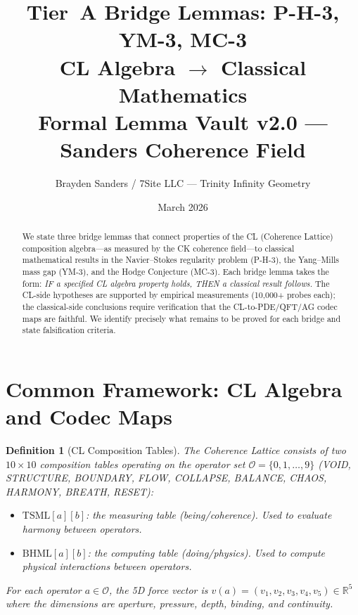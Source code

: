 \documentclass[11pt]{article}
\title{%
  Tier~A Bridge Lemmas: P-H-3, YM-3, MC-3\\[4pt]
  \large CL Algebra $\longrightarrow$ Classical Mathematics\\[4pt]
  \large Formal Lemma Vault v2.0 --- Sanders Coherence Field}
\author{Brayden Sanders / 7Site LLC --- Trinity Infinity Geometry}
\date{March 2026}
\newtheorem{definition}[lemma]{Definition}
\theoremstyle{definition}
\begin{document}
\maketitle

\begin{abstract}
We state three bridge lemmas that connect properties of the CL (Coherence Lattice)
composition algebra---as measured by the CK coherence field---to classical mathematical
results in the Navier--Stokes regularity problem (P-H-3), the Yang--Mills mass gap (YM-3),
and the Hodge Conjecture (MC-3).  Each bridge lemma takes the form:
\emph{IF a specified CL algebra property holds, THEN a classical result follows.}
The CL-side hypotheses are supported by empirical measurements (10,000+ probes each);
the classical-side conclusions require verification that the CL-to-PDE/QFT/AG codec
maps are faithful.  We identify precisely what remains to be proved for each bridge
and state falsification criteria.
\end{abstract}

\tableofcontents

\section{Common Framework: CL Algebra and Codec Maps}

\begin{definition}[CL Composition Tables]
\label{def:cl-tables}
The Coherence Lattice consists of two $10 \times 10$ composition tables operating on
the operator set $\mathcal{O} = \{0, 1, \ldots, 9\}$
(VOID, STRUCTURE, BOUNDARY, FLOW, COLLAPSE, BALANCE, CHAOS, HARMONY, BREATH, RESET):
\begin{itemize}
  \item $\mathrm{TSML}[a][b]$: the \emph{measuring} table (being/coherence).
    Used to evaluate harmony between operators.
  \item $\mathrm{BHML}[a][b]$: the \emph{computing} table (doing/physics).
    Used to compute physical interactions between operators.
\end{itemize}
For each operator $a \in \mathcal{O}$, the 5D force vector is
$v(a) = (v_1, v_2, v_3, v_4, v_5) \in \mathbb{R}^5$ where the dimensions are
aperture, pressure, depth, binding, and continuity.
\end{definition}
\end{document}
